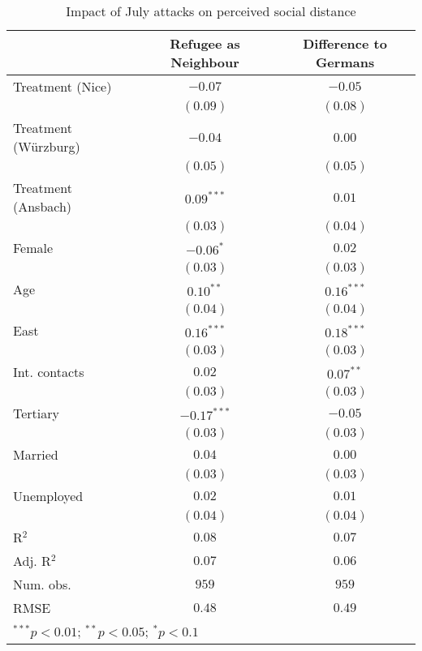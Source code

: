 
\begin{table}
\caption{Impact of July attacks on perceived social distance}
\begin{center}
\begin{tabular}{l c c}
\toprule
 & Refugee as Neighbour & Difference to Germans \\
\midrule
Treatment (Nice)     & $-0.07$       & $-0.05$      \\
                     & $(0.09)$      & $(0.08)$     \\
Treatment (Würzburg) & $-0.04$       & $0.00$       \\
                     & $(0.05)$      & $(0.05)$     \\
Treatment (Ansbach)  & $0.09^{***}$  & $0.01$       \\
                     & $(0.03)$      & $(0.04)$     \\
Female               & $-0.06^{*}$   & $0.02$       \\
                     & $(0.03)$      & $(0.03)$     \\
Age                  & $0.10^{**}$   & $0.16^{***}$ \\
                     & $(0.04)$      & $(0.04)$     \\
East                 & $0.16^{***}$  & $0.18^{***}$ \\
                     & $(0.03)$      & $(0.03)$     \\
Int. contacts        & $0.02$        & $0.07^{**}$  \\
                     & $(0.03)$      & $(0.03)$     \\
Tertiary             & $-0.17^{***}$ & $-0.05$      \\
                     & $(0.03)$      & $(0.03)$     \\
Married              & $0.04$        & $0.00$       \\
                     & $(0.03)$      & $(0.03)$     \\
Unemployed           & $0.02$        & $0.01$       \\
                     & $(0.04)$      & $(0.04)$     \\
\midrule
R$^2$                & $0.08$        & $0.07$       \\
Adj. R$^2$           & $0.07$        & $0.06$       \\
Num. obs.            & $959$         & $959$        \\
RMSE                 & $0.48$        & $0.49$       \\
\bottomrule
\multicolumn{3}{l}{\scriptsize{$^{***}p<0.01$; $^{**}p<0.05$; $^{*}p<0.1$}}
\end{tabular}
\label{tab_dist}
\end{center}
\end{table}
